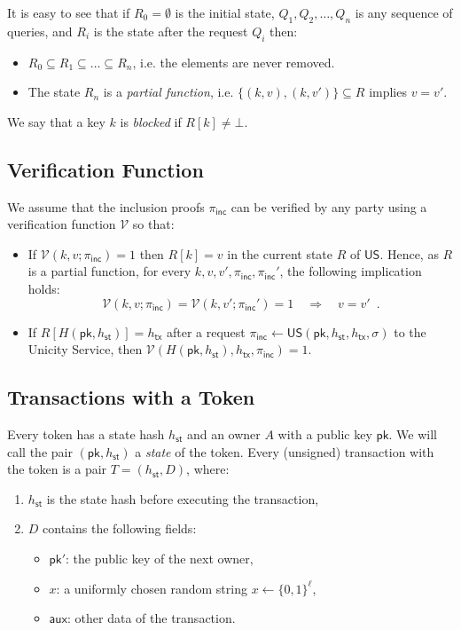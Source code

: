 \documentclass{article}
\newcommand{\pubkey}[0]{\mathsf{pk}}
\newcommand{\unisrv}[0]{\mathsf{US}}
\newcommand{\sthash}[0]{h_\mathsf{st}}
\newcommand{\txhash}[0]{h_\mathsf{tx}}
\newcommand{\auxd}[0]{\mathsf{aux}}
\newcommand{\univer}[0]{\mathcal{V}}
\newcommand{\pinc}[0]{\pi_{\mathsf{inc}}}
\begin{document}
\noindent It is easy to see that if $R_0 = \emptyset$ is the initial state, $Q_1, Q_2, \ldots, Q_n$ is any sequence of queries, and $R_i$ is the state after the request $Q_i$ then:
\begin{itemize}
\item $R_0 \subseteq R_1 \subseteq \ldots \subseteq R_n$, i.e. the elements are never removed.
\item The state $R_n$ is a \emph{partial function}, i.e.
$\{(k, v), (k, v')\} \subseteq R$ implies $v = v'$.
\end{itemize}

We say that a key $k$ is \emph{blocked} if $R[k] \neq \bot$.

\subsection{Verification Function}

We assume that the inclusion proofs $\pinc$ can be verified by any party using a verification function $\univer$ so that:
\begin{itemize}
\item If $\univer(k, v; \pinc) = 1$ then $R[k] = v$ in the current state $R$ of $\unisrv$. Hence, as $R$ is a partial function, for every $k, v, v', \pinc, \pinc'$, the following implication holds:
\begin{equation}\label{eq:eqtx}
\univer(k, v; \pinc) = \univer(k, v'; \pinc') = 1 \quad \Rightarrow \quad v =v' \enspace.
\end{equation}
\item If $R[H(\pubkey, \sthash)] = \txhash$ after a request $\pinc \gets \unisrv(\pubkey, \sthash, \txhash, \sigma)$ to the Unicity Service, then $\univer(H(\pubkey, \sthash), \txhash, \pinc) = 1$.
\end{itemize}

\subsection{Transactions with a Token}

Every token has a state hash $\sthash$ and an owner $A$ with a public key $\pubkey$. We will call the pair $(\pubkey, \sthash)$ a \emph{state} of the token.
Every (unsigned) transaction with the token is a pair
$T = (\sthash, D)$, where:
\begin{enumerate}
\item $\sthash$ is the state hash before executing the transaction,
\item $D$ contains the following fields:
\begin{itemize}
\item $\pubkey'$: the public key of the next owner,
\item $x$: a uniformly chosen random string $x\gets\{0,1\}^\ell$,
\item $\auxd$: other data of the transaction.
\end{itemize}
\end{enumerate}
\end{document}
